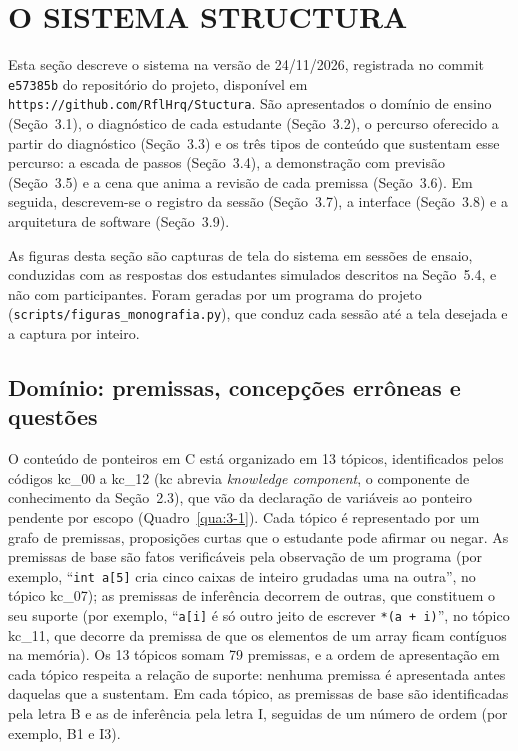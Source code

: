 
\chapter{\texorpdfstring{\mbox{O} \mbox{SISTEMA} \mbox{STRUCTURA}}{O SISTEMA STRUCTURA}}\label{cap:3}

Esta seção descreve o sistema na versão de 24/11/2026, registrada no commit \texttt{e57385b} do repositório do projeto, disponível em \texttt{https:/\allowbreak{}/\allowbreak{}github.\allowbreak{}com/\allowbreak{}RflHrq/\allowbreak{}Stuctura}. São apresentados o domínio de ensino (Seção~3.1), o diagnóstico de cada estudante (Seção~3.2), o percurso oferecido a partir do diagnóstico (Seção~3.3) e os três tipos de conteúdo que sustentam esse percurso: a escada de passos (Seção~3.4), a demonstração com previsão (Seção~3.5) e a cena que anima a revisão de cada premissa (Seção~3.6). Em seguida, descrevem-se o registro da sessão (Seção~3.7), a interface (Seção~3.8) e a arquitetura de software (Seção~3.9).

As figuras desta seção são capturas de tela do sistema em sessões de ensaio, conduzidas com as respostas dos estudantes simulados descritos na Seção~5.4, e não com participantes. Foram geradas por um programa do projeto (\texttt{scripts/\allowbreak{}figuras\_\allowbreak{}monografia.\allowbreak{}py}), que conduz cada sessão até a tela desejada e a captura por inteiro.

\section{Domínio: premissas, concepções errôneas e questões}

O conteúdo de ponteiros em C está organizado em 13 tópicos, identificados pelos códigos kc\_00 a kc\_12 (kc abrevia \textit{knowledge component}, o componente de conhecimento da Seção~2.3), que vão da declaração de variáveis ao ponteiro pendente por escopo (Quadro~\ref{qua:3-1}). Cada tópico é representado por um grafo de premissas, proposições curtas que o estudante pode afirmar ou negar. As premissas de base são fatos verificáveis pela observação de um programa (por exemplo, ``\texttt{int a[5]} cria cinco caixas de inteiro grudadas uma na outra'', no tópico kc\_07); as premissas de inferência decorrem de outras, que constituem o seu suporte (por exemplo, ``\texttt{a[i]} é só outro jeito de escrever \texttt{*(a + i)}'', no tópico kc\_11, que decorre da premissa de que os elementos de um array ficam contíguos na memória). Os 13 tópicos somam 79 premissas, e a ordem de apresentação em cada tópico respeita a relação de suporte: nenhuma premissa é apresentada antes daquelas que a sustentam. Em cada tópico, as premissas de base são identificadas pela letra B e as de inferência pela letra I, seguidas de um número de ordem (por exemplo, B1 e I3).

